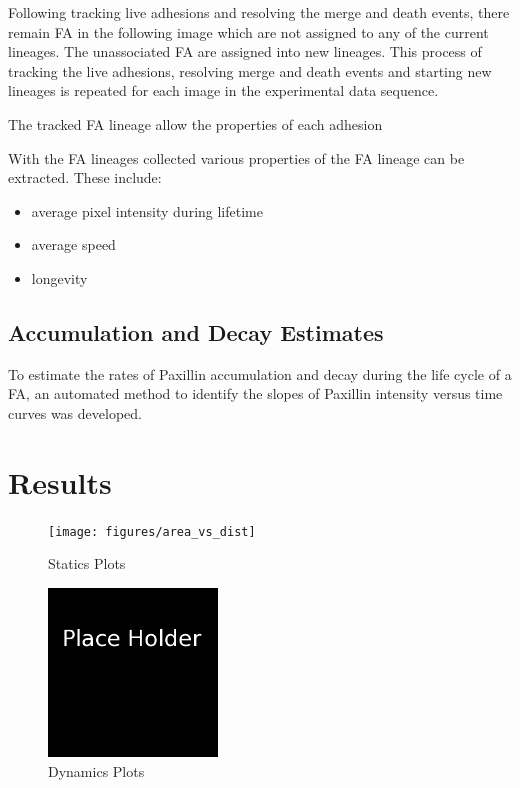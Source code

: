 \documentclass[letterpaper,twocolumn]{article}
\begin{document}
Following tracking live adhesions and resolving the merge and death events, there remain FA in the following image which are not assigned to any of the current lineages. The unassociated FA are assigned into new lineages. This process of tracking the live adhesions, resolving merge and death events and starting new lineages is repeated for each image in the experimental data sequence. 

The tracked FA lineage allow the properties of each adhesion %

With the FA lineages collected various properties of the FA lineage can be extracted. These include:

\begin{itemize}
\item average pixel intensity during lifetime
\item average speed
\item longevity
\end{itemize}

\subsection*{Accumulation and Decay Estimates}

To estimate the rates of Paxillin accumulation and decay during the life cycle of a FA, an automated method to identify the slopes of Paxillin intensity versus time curves was developed. 

\section*{Results}

\begin{figure}[htbp]
\begin{center}
\texttt{[image: figures/area\_vs\_dist]}
\caption{Statics Plots}
\label{statics_figure}
\end{center}
\end{figure}

\begin{figure}[htbp]
\begin{center}
\includegraphics[width=0.4\textwidth]{figures/place_holder}
\caption{Dynamics Plots}
\label{dynamics_figure}
\end{center}
\end{figure}
\end{document}
